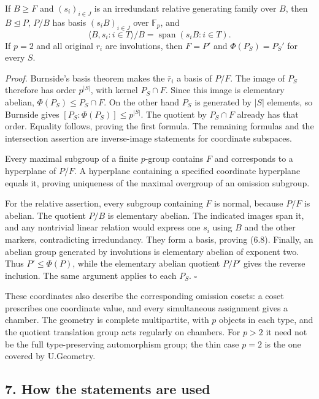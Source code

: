\documentclass[
  11pt,
  a4paper,
]{article}
\begin{document}
If \(B\geq F\) and \((s_i)_{i\in J}\) is an irredundant relative
generating family over \(B\), then \(B\unlhd P\), \(P/B\) has basis
\((s_iB)_{i\in J}\) over \(\mathbb F_p\), and \[
\langle B,s_i:i\in T\rangle/B=\operatorname{span}(s_iB:i\in T).
\tag{6.8}
\] If \(p=2\) and all original \(r_i\) are involutions, then \(F=P'\)
and \(\Phi(P_S)=P_S'\) for every \(S\).

\emph{Proof.} Burnside's basis theorem makes the \(\bar r_i\) a basis of
\(P/F\). The image of \(P_S\) therefore has order \(p^{|S|}\), with
kernel \(P_S\cap F\). Since this image is elementary abelian,
\(\Phi(P_S)\leq P_S\cap F\). On the other hand \(P_S\) is generated by
\(|S|\) elements, so Burnside gives \([P_S:\Phi(P_S)]\leq p^{|S|}\). The
quotient by \(P_S\cap F\) already has that order. Equality follows,
proving the first formula. The remaining formulas and the intersection
assertion are inverse-image statements for coordinate subspaces.

Every maximal subgroup of a finite \(p\)-group contains \(F\) and
corresponds to a hyperplane of \(P/F\). A hyperplane containing a
specified coordinate hyperplane equals it, proving uniqueness of the
maximal overgroup of an omission subgroup.

For the relative assertion, every subgroup containing \(F\) is normal,
because \(P/F\) is abelian. The quotient \(P/B\) is elementary abelian.
The indicated images span it, and any nontrivial linear relation would
express one \(s_i\) using \(B\) and the other markers, contradicting
irredundancy. They form a basis, proving (6.8). Finally, an abelian
group generated by involutions is elementary abelian of exponent two.
Thus \(P'\leq\Phi(P)\), while the elementary abelian quotient \(P/P'\)
gives the reverse inclusion. The same argument applies to each \(P_S\).
\(\square\)

These coordinates also describe the corresponding omission cosets: a
coset prescribes one coordinate value, and every simultaneous assignment
gives a chamber. The geometry is complete multipartite, with \(p\)
objects in each type, and the quotient translation group acts regularly
on chambers. For \(p>2\) it need not be the full type-preserving
automorphism group; the thin case \(p=2\) is the one covered by
U.Geometry.

\subsection{7. How the statements are
used}\label{how-the-statements-are-used}
\end{document}
